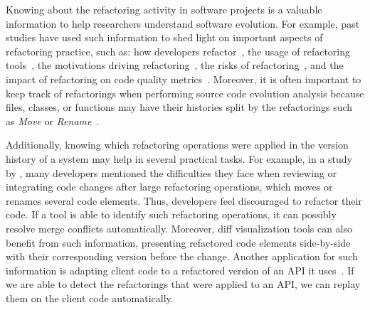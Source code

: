 Knowing about the refactoring activity in software projects is a valuable information to help researchers understand software evolution.
For example, past studies have used such information to shed light on important aspects of refactoring practice, such as: how developers refactor~\citep{MurphyHill2012}, the usage of refactoring tools~\citep{negara2013, MurphyHill2012}, the motivations driving refactoring~\cite{Kim:2012:FSE, kim-tse-2014, fse2016-why-we-refactor}, the risks of refactoring~\citep{Kim:2012:FSE, kim-tse-2014, Kim:2011, weissgerber2006refactorings, bavota2012does}, and the impact of refactoring on code quality metrics~\citep{Kim:2012:FSE, kim-tse-2014}.
Moreover, it is often important to keep track of refactorings when performing source code evolution analysis because files, classes, or functions may have their histories split by the refactorings such as \emph{Move} or \emph{Rename}~\cite{icse2018}.

Additionally, knowing which refactoring operations were applied in the version history of a system may help in several practical tasks.
For example, in a study by \cite{Kim:2012:FSE}, many developers mentioned the difficulties they face when reviewing or integrating code changes after large refactoring operations, which moves or renames several code elements. Thus, developers feel discouraged to refactor their code. If a tool is able to identify such refactoring operations, it can possibly resolve merge conflicts automatically. 
Moreover, diff visualization tools can also benefit from such information, presenting refactored code elements side-by-side with their corresponding version before the change.
Another application for such information is adapting client code to a refactored version of an API it uses~\citep{henkel2005catchup, Xing:2008:JDevAn}. If we are able to detect the refactorings that were applied to an API, we can replay them on the client code automatically.


